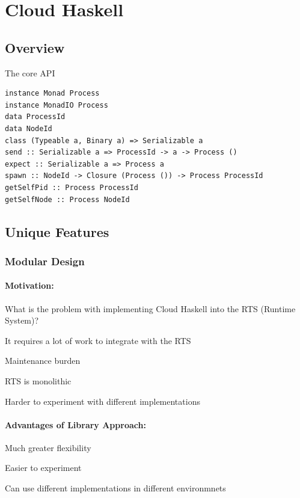 \documentclass[twoside]{article}
\begin{document}

\section{Cloud Haskell}
\label{sec:cloud-haskell}

\subsection{Overview}
\label{sec:overview}
The core API
\begin{lstlisting}
instance Monad Process
instance MonadIO Process
data ProcessId
data NodeId
class (Typeable a, Binary a) => Serializable a
send :: Serializable a => ProcessId -> a -> Process ()
expect :: Serializable a => Process a
spawn :: NodeId -> Closure (Process ()) -> Process ProcessId
getSelfPid :: Process ProcessId
getSelfNode :: Process NodeId
\end{lstlisting}


\subsection{Unique Features}
\label{sec:unique-features}

\subsubsection{Modular Design}
\label{sec:modular-design}

\paragraph{Motivation:} What is the problem with implementing Cloud
Haskell into the RTS (Runtime System)? 
\begin{compactitem}
\item It requires a lot of work to integrate with the RTS
\item Maintenance burden
\item RTS is monolithic
\item Harder to experiment with different implementations
\end{compactitem}

\paragraph{Advantages of Library Approach:}
\begin{compactitem}
\item Much greater flexibility
\item Easier to experiment
\item Can use different implementations in different environmnets
\end{compactitem} 
\end{document}
